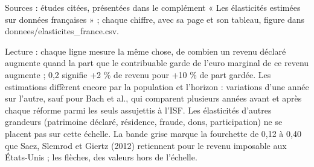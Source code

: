Sources : études citées, présentées dans le complément « Les élasticités estimées sur données françaises » ; chaque chiffre, avec sa page et son tableau, figure dans donnees/elasticites\_france.csv.\par Lecture : chaque ligne mesure la même chose, de combien un revenu déclaré augmente quand la part que le contribuable garde de l'euro marginal de ce revenu augmente ; 0,2 signifie +2 \% de revenu pour +10 \% de part gardée. Les estimations diffèrent encore par la population et l'horizon : variations d'une année sur l'autre, sauf pour Bach et al., qui comparent plusieurs années avant et après chaque réforme parmi les seuls assujettis à l'ISF. Les élasticités d'autres grandeurs (patrimoine déclaré, résidence, fraude, dons, participation) ne se placent pas sur cette échelle. La bande grise marque la fourchette de 0,12 à 0,40 que Saez, Slemrod et Giertz (2012) retiennent pour le revenu imposable aux États-Unis ; les flèches, des valeurs hors de l'échelle.
